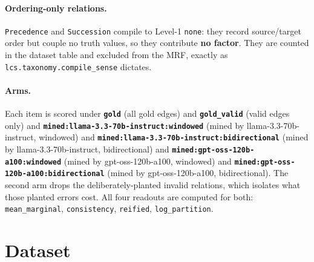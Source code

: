 \documentclass[11pt]{article}
\begin{document}
\paragraph{Ordering-only relations.} \texttt{Precedence} and \texttt{Succession} compile to Level-1 \texttt{none}: they record source/target order but couple no truth values, so they contribute \textbf{no factor}. They are counted in the dataset table and excluded from the MRF, exactly as \texttt{lcs.taxonomy.compile\_sense} dictates.

\paragraph{Arms.} Each item is scored under \textbf{\texttt{gold}} (all gold edges) and \textbf{\texttt{gold\_valid}} (valid edges only) and \textbf{\texttt{mined:llama-3.3-70b-instruct:windowed}} (mined by llama-3.3-70b-instruct, windowed) and \textbf{\texttt{mined:llama-3.3-70b-instruct:bidirectional}} (mined by llama-3.3-70b-instruct, bidirectional) and \textbf{\texttt{mined:gpt-oss-120b-a100:windowed}} (mined by gpt-oss-120b-a100, windowed) and \textbf{\texttt{mined:gpt-oss-120b-a100:bidirectional}} (mined by gpt-oss-120b-a100, bidirectional). The second arm drops the deliberately-planted invalid relations, which isolates what those planted errors cost. All four readouts are computed for both: \texttt{mean\_marginal}, \texttt{consistency}, \texttt{reified}, \texttt{log\_partition}.

\section{Dataset}
\end{document}
